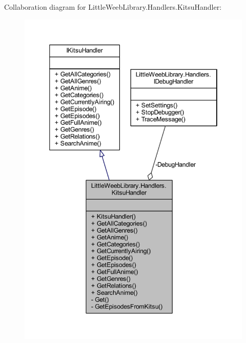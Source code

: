 Collaboration diagram for Little\+Weeb\+Library.\+Handlers.\+Kitsu\+Handler\+:\nopagebreak
\begin{figure}[H]
\begin{center}
\leavevmode
\includegraphics[width=346pt]{class_little_weeb_library_1_1_handlers_1_1_kitsu_handler__coll__graph}
\end{center}
\end{figure}
